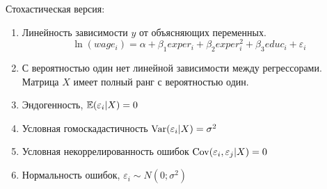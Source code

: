 \documentclass[addpoints, answers]{exam} %
\begin{document}
\begin{questions}
\begin{parts}
\begin{solution}
Стохастическая версия:

\begin{enumerate}
\item Линейность зависимости $y$ от объясняющих переменных.
\[
\ln(wage_i) = \alpha + \beta_1 exper_i + \beta_2 exper_i^2 + \beta_3 educ_i  + \varepsilon_i
\]
\item С вероятностью один нет линейной зависимости между регрессорами. Матрица $X$ имеет полный ранг с вероятностью один.
\item Эндогенность, $\mathbb{E}(\varepsilon_i | X)=0$
\item Условная гомоскадастичность $\operatorname{Var}(\varepsilon_i |X)=\sigma^2$
\item Условная некоррелированность ошибок $\operatorname{Cov}(\varepsilon_i,\varepsilon_j |X)=0$
\item Нормальность ошибок, $\varepsilon_i \sim N(0;\sigma^2)$
\end{enumerate}

\end{solution}

\end{parts}

\end{questions}
\end{document}
